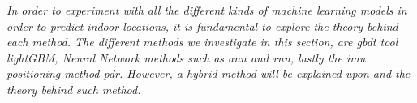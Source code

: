 \textit{In order to experiment with all the different kinds of machine learning models in order to predict indoor locations, it is fundamental to explore the theory behind each method. The different methods we investigate in this section, are \gls{gbdt} tool lightGBM, Neural Network methods such as \gls{ann} and \gls{rnn}, lastly the \gls{imu} positioning method \gls{pdr}. However, a hybrid method will be explained upon and the theory behind such method.}